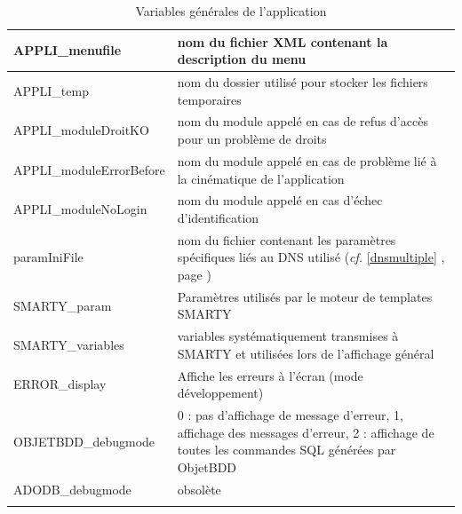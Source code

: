 \begin{longtable}{|p{5cm}|p{8cm}|}
\hline
APPLI\_menufile & nom du fichier XML contenant la description du menu\\
\hline
APPLI\_temp & nom du dossier utilisé pour stocker les fichiers temporaires\\
\hline
APPLI\_moduleDroitKO & nom du module appelé en cas de refus d'accès pour un problème de droits \\
\hline
APPLI\_moduleErrorBefore & nom du module appelé en cas de problème lié à la cinématique de l'application\\
\hline
APPLI\_moduleNoLogin & nom du module appelé en cas d'échec d'identification \\
\hline
paramIniFile & nom du fichier contenant les paramètres spécifiques liés au DNS utilisé (\textit{cf.} \ref{dnsmultiple} \textit{\nameref{dnsmultiple}}, page \pageref{dnsmultiple}) \\
\hline
SMARTY\_param & Paramètres utilisés par le moteur de templates SMARTY\\
\hline
SMARTY\_variables & variables systématiquement transmises à SMARTY et utilisées lors de l'affichage général\\
\hline
ERROR\_display & Affiche les erreurs à l'écran (mode développement)\\
\hline
OBJETBDD\_debugmode & 0 : pas d'affichage de message d'erreur, 1, affichage des messages d'erreur, 2 : affichage de toutes les commandes SQL générées par ObjetBDD \\
\hline
ADODB\_debugmode & obsolète \\
\hline
\caption{Variables générales de l'application}
\end{longtable} 

